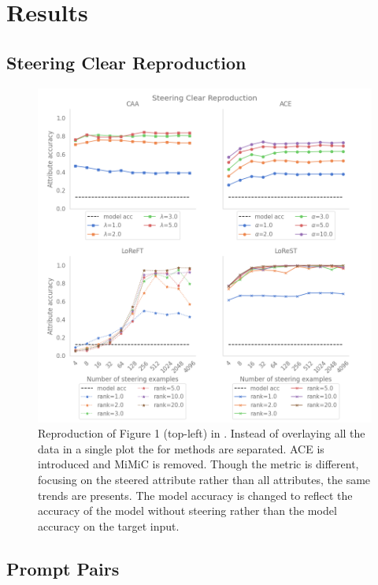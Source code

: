 \chapter{Results}

\section{Steering Clear Reproduction}

\begin{figure}
    \centering
    \captionsetup{width=\textwidth}
    \includegraphics[width=\textwidth]{figures/steering_clear.png}
    \caption{
        Reproduction of Figure 1 (top-left) in \citet{steering-clear}.
        Instead of overlaying all the data in a single plot the for methods are separated.
        ACE \citep{ace} is introduced and MiMiC \citep{mimic} is removed.
        Though the metric is different, focusing on the steered attribute rather than all attributes, the same trends are presents.
        The model accuracy is changed to reflect the accuracy of the model without steering rather than the model accuracy on the target input.
    }
    \label{fig:gpt-pp-sae}
\end{figure}

\section{Prompt Pairs}

